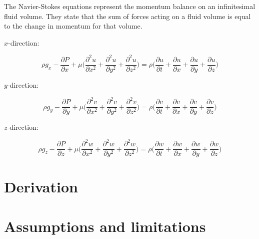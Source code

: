 The Navier-Stokes equations represent the momentum balance on an infinitesimal fluid volume. They state that the sum of forces acting on a fluid volume is equal to the change in momentum for that volume.

$x$-direction:

\begin{equation}
\rho g_x - \frac{\partial P}{\partial x} + \mu \Big( \frac{\partial^2 u}{\partial x^2} + \frac{\partial^2 u}{\partial y^2} + \frac{\partial^2 u}{\partial z^2}\Big) = \rho \Big( \frac{\partial u}{\partial t} + \frac{\partial u}{\partial x} + \frac{\partial u}{\partial y} + \frac{\partial u}{\partial z} \Big)
\end{equation}

$y$-direction:

\begin{equation}
\rho g_y - \frac{\partial P}{\partial y} + \mu \Big( \frac{\partial^2 v}{\partial x^2} + \frac{\partial^2 v}{\partial y^2} + \frac{\partial^2 v}{\partial z^2}\Big) = \rho \Big( \frac{\partial v}{\partial t} + \frac{\partial v}{\partial x} + \frac{\partial v}{\partial y} + \frac{\partial v}{\partial z} \Big)
\end{equation}

$z$-direction:

\begin{equation}
\rho g_z - \frac{\partial P}{\partial z} + \mu \Big( \frac{\partial^2 w}{\partial x^2} + \frac{\partial^2 w}{\partial y^2} + \frac{\partial^2 w}{\partial z^2}\Big) = \rho \Big( \frac{\partial w}{\partial t} + \frac{\partial w}{\partial x} + \frac{\partial w}{\partial y} + \frac{\partial w}{\partial z} \Big)
\end{equation}


\section{Derivation}



\section{Assumptions and limitations}

